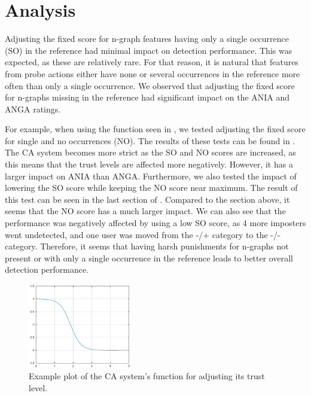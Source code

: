\chapter{Analysis}
\label{chap:analysis}

Adjusting the fixed score for n-graph features having only a single occurrence (SO) in the reference had minimal impact on detection performance.
This was expected, as these are relatively rare.
For that reason, it is natural that features from probe actions either have none or several occurrences in the reference more often than only a single occurrence.
We observed that adjusting the fixed score for n-graphs missing in the reference had significant impact on the ANIA and ANGA ratings.


For example, when using the function seen in , we tested adjusting the fixed score for single and no occurrences (NO).
The results of these tests can be found in .
The CA system becomes more strict as the SO and NO scores are increased, as this means that the trust levels are affected more negatively.
However, it has a larger impact on ANIA than ANGA.
Furthermore, we also tested the impact of lowering the SO score while keeping the NO score near maximum.
The result of this test can be seen in the last section of .
Compared to the section above, it seems that the NO score has a much larger impact.
We can also see that the performance was negatively affected by using a low SO score, as 4 more imposters went undetected, and one user was moved from the -/+ category to the -/- category.
Therefore, it seems that having harsh punishments for n-graphs not present or with only a single occurrence in the reference leads to better overall detection performance.

\begin{figure}[h]
    \centering
    \includegraphics[width=0.4\textwidth]{figures/sig185.eps}
    \caption{Example plot of the CA system's function for adjusting its trust level.}
    \label{fig:sig185}
\end{figure}

